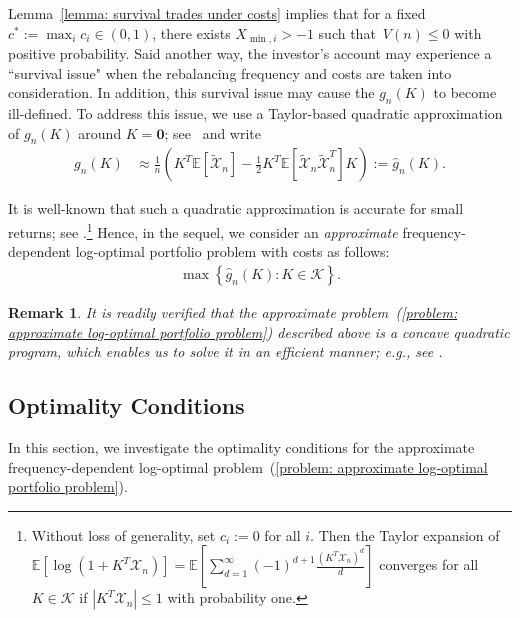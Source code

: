 \documentclass[10pt]{article} %
\newtheorem{remark}{Remark}[section]
\begin{document}
	
	
	
	Lemma~\ref{lemma: survival trades under costs} implies that for a fixed $c^*:=\max_i c_i \in (0,1)$, there exists $X_{\min,i} > -1$ such that~$V(n) \leq 0$ with positive probability.
	Said another way, the investor's account may experience a ``survival issue"  when the rebalancing frequency and costs are taken into  consideration. 
	In addition, this survival issue may cause the $g_n(K)$ to become ill-defined.
	To address this issue, we use a Taylor-based quadratic approximation of $g_n(K)$ around $K = \textbf{0}$; see~\cite{casella2021statistical} and write
	\begin{align} \label{eq: approximate expected log growth}
		g_n(K)
		&\approx \frac{1}{n} \left( K^T \mathbb{E}\left[ \widetilde{\mathcal{X}}_n \right] 
		- \frac{1}{2}K^T\mathbb{E}\left[ \widetilde{\mathcal{X}}_n \widetilde{\mathcal{X}}_n^T \right] K \right):=\widehat{g}_n(K).
	\end{align}
	
	It is well-known that such a quadratic approximation is accurate for small returns; see \cite{pulley1983mean}.\footnote{Without loss of generality, set $c_i:=0$ for all $i$. Then the Taylor expansion of $\mathbb{E}\left[ \log(1+K^T\mathcal{X}_n) \right]  = \mathbb{E}\left[ \sum_{d=1}^\infty (-1)^{d+1} \frac{ (K^T\mathcal{X}_n)^d}{d} \right]$ converges for all $K \in \mathcal{K}$ if $|K^T \mathcal{X}_n| \leq 1 $ with probability one. 
	}
	Hence, in the sequel, we consider an \textit{approximate} frequency-dependent log-optimal portfolio problem with costs as follows:
	\begin{align}
		\max  \left\{\widehat{g}_n(K): K \in \mathcal{K} \right\}. \label{problem: approximate log-optimal portfolio problem}
	\end{align}
	
	\begin{remark} \rm
		It is readily verified that	the approximate problem~(\ref{problem: approximate log-optimal portfolio problem}) described above is a \textit{concave quadratic program}, which enables us to solve it in an efficient manner; e.g., see \cite{diamond2016cvxpy}.
	\end{remark}
	
	\subsection{Optimality Conditions}
	In this section, we investigate the optimality conditions for the approximate frequency-dependent log-optimal problem~(\ref{problem: approximate log-optimal portfolio problem}).
	
\end{document}
